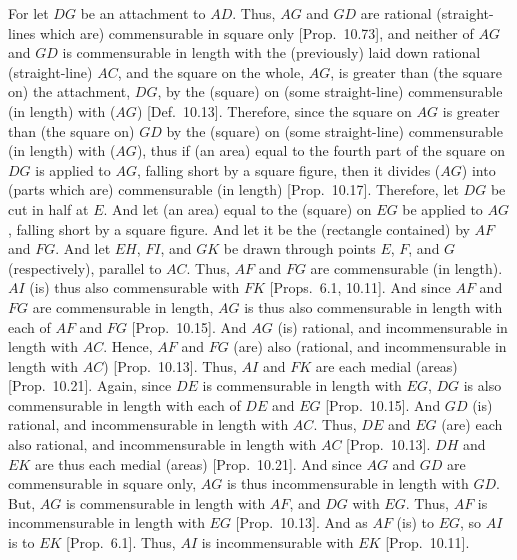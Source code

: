 \begin{Parallel}{}{}
{For let $DG$ be an attachment to $AD$. Thus, $AG$ and $GD$ are rational (straight-lines which are) commensurable in square only [Prop.~10.73], and neither of $AG$ and $GD$
is commensurable in length with the (previously) laid down rational (straight-line) $AC$, and the square on the whole, $AG$, is greater than
(the square on) the attachment, $DG$, by the (square) on (some straight-line)
commensurable (in length) with ($AG$) [Def.~10.13]. 
Therefore, since the square on $AG$ is greater than (the square on)
$GD$ by the (square) on (some straight-line) commensurable (in length)
with ($AG$), thus if (an area) equal to the fourth part of the square on $DG$
is applied to $AG$, falling short by a square figure, then it divides ($AG$)
into (parts which are) commensurable (in length) [Prop.~10.17]. Therefore, let $DG$ be
cut in half at $E$. And let (an area) equal to the (square) on $EG$
be applied to $AG$, falling short by a square figure.
And let it be the (rectangle contained) by $AF$ and $FG$. And let
$EH$, $FI$, and $GK$ be drawn through points $E$, $F$, and $G$
(respectively), parallel to $AC$. Thus, $AF$ and $FG$ are
commensurable (in length). $AI$ (is) thus also commensurable with
$FK$ [Props.~6.1, 10.11]. 
 And since $AF$ and $FG$ are commensurable
in length, $AG$ is thus also commensurable in length with each of
$AF$ and $FG$ [Prop.~10.15]. And
$AG$ (is) rational, and incommensurable in length with $AC$. 
Hence, $AF$ and $FG$ (are) also (rational, and incommensurable in length
with $AC$) [Prop.~10.13]. 
Thus, $AI$ and $FK$ are each medial (areas) [Prop.~10.21]. Again, since $DE$ is commensurable
in length with $EG$, $DG$ is also commensurable
in length with each of $DE$ and $EG$ [Prop.~10.15]. And $GD$ (is) rational, and incommensurable in length with $AC$. Thus, $DE$ and $EG$ (are)
each also rational, and incommensurable in length with $AC$ [Prop.~10.13]. $DH$ and $EK$ are thus
each medial (areas) [Prop.~10.21]. And since 
$AG$ and $GD$ are commensurable in square only, $AG$ is thus
incommensurable in length with $GD$. But, $AG$ is commensurable in
length with $AF$, and $DG$ with $EG$. Thus, $AF$ is incommensurable
in length with $EG$ [Prop.~10.13]. 
And as $AF$ (is) to $EG$, so $AI$ is to $EK$ [Prop.~6.1]. Thus, $AI$ is incommensurable with $EK$ [Prop.~10.11].

}
\end{Parallel}
